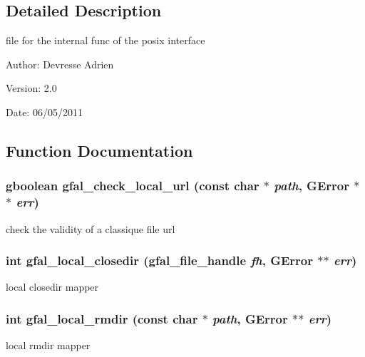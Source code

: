 \subsection{Detailed Description}
file for the internal func of the posix interface 

\begin{Desc}
\item[Author:]Devresse Adrien \end{Desc}
\begin{Desc}
\item[Version:]2.0 \end{Desc}
\begin{Desc}
\item[Date:]06/05/2011 \end{Desc}


\subsection{Function Documentation}
\subsubsection{\setlength{\rightskip}{0pt plus 5cm}gboolean gfal\_\-check\_\-local\_\-url (const char $\ast$ {\em path}, GError $\ast$$\ast$ {\em err})}\label{gfal__posix__local__file_8c_02987ce8beeb908c36ee3d4ef3bc5618}


check the validity of a classique file url 
\subsubsection{\setlength{\rightskip}{0pt plus 5cm}int gfal\_\-local\_\-closedir (gfal\_\-file\_\-handle {\em fh}, GError $\ast$$\ast$ {\em err})}\label{gfal__posix__local__file_8c_483fdd49a5459dc85237e75fd03280bf}


local closedir mapper 
\subsubsection{\setlength{\rightskip}{0pt plus 5cm}int gfal\_\-local\_\-rmdir (const char $\ast$ {\em path}, GError $\ast$$\ast$ {\em err})}\label{gfal__posix__local__file_8c_a89a8db8cb79bf7c575b08305704c248}


local rmdir mapper 